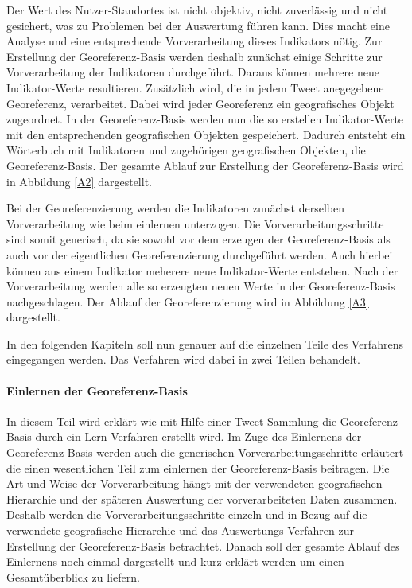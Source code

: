 	Der Wert des Nutzer-Standortes ist nicht objektiv, nicht zuverlässig und nicht gesichert, was zu Problemen bei der Auswertung führen kann.
	Dies macht eine Analyse und eine entsprechende Vorverarbeitung dieses Indikators nötig.
	Zur Erstellung der Georeferenz-Basis werden deshalb zunächst einige Schritte zur Vorverarbeitung der Indikatoren durchgeführt.
	Daraus können mehrere neue Indikator-Werte resultieren.
	Zusätzlich wird, die in jedem Tweet anegegebene Georeferenz, verarbeitet.
	Dabei wird jeder Georeferenz ein geografisches Objekt zugeordnet.
	In der Georeferenz-Basis werden nun die so erstellen Indikator-Werte mit den entsprechenden geografischen Objekten gespeichert.
	Dadurch entsteht ein Wörterbuch mit Indikatoren und zugehörigen geografischen Objekten, die Georeferenz-Basis.
	Der gesamte Ablauf zur Erstellung der Georeferenz-Basis wird in Abbildung \ref{A2} dargestellt.

	Bei der Georeferenzierung werden die Indikatoren zunächst derselben Vorverarbeitung wie beim einlernen unterzogen.
	Die Vorverarbeitungsschritte sind somit generisch, da sie sowohl vor dem erzeugen der Georeferenz-Basis als auch vor der eigentlichen Georeferenzierung durchgeführt werden.
	Auch hierbei können aus einem Indikator meherere neue Indikator-Werte entstehen.
	Nach der Vorverarbeitung werden alle so erzeugten neuen Werte in der Georeferenz-Basis nachgeschlagen.
	Der Ablauf der Georeferenzierung wird in Abbildung \ref{A3} dargestellt. 


	In den folgenden Kapiteln soll nun genauer auf die einzelnen Teile des Verfahrens eingegangen werden. 
	Das Verfahren wird dabei in zwei Teilen behandelt.

	\paragraph{Einlernen der Georeferenz-Basis}  
	In diesem Teil wird erklärt wie mit Hilfe einer Tweet-Sammlung die Georeferenz-Basis durch ein Lern-Verfahren erstellt wird.
	Im Zuge des Einlernens der Georeferenz-Basis werden auch die generischen Vorverarbeitungsschritte erläutert die einen wesentlichen Teil zum einlernen der Georeferenz-Basis beitragen.
	Die Art und Weise der Vorverarbeitung hängt mit der verwendeten geografischen Hierarchie und der späteren Auswertung der vorverarbeiteten Daten zusammen.
	Deshalb werden die Vorverarbeitungsschritte einzeln und in Bezug auf die verwendete geografische Hierarchie und das Auswertungs-Verfahren zur Erstellung der Georeferenz-Basis betrachtet.
	Danach soll der gesamte Ablauf des Einlernens noch einmal dargestellt und kurz erklärt werden um einen Gesamtüberblick zu liefern.
	
